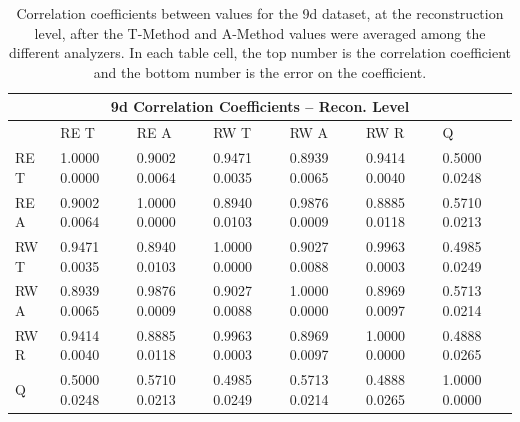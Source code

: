 \begin{table}[t]
\setlength\tabcolsep{15pt}
\footnotesize
\centering
\renewcommand{\arraystretch}{1.4}
\begin{tabularx}{0.8\linewidth}{@{\extracolsep{\fill}}lXXXXXX}
  \toprule
  	\multicolumn{7}{c}{{\normalsize 9d Correlation Coefficients -- Recon. Level}} \\
  \midrule
  	       & RE T & RE A & RW T & RW A & RW R & \quad Q \\
  \midrule
	RE T   & 1.0000 0.0000 & 0.9002 0.0064 & 0.9471 0.0035 & 0.8939 0.0065 & 0.9414 0.0040 & 0.5000 0.0248  \\
	RE A   & 0.9002 0.0064 & 1.0000 0.0000 & 0.8940 0.0103 & 0.9876 0.0009 & 0.8885 0.0118 & 0.5710 0.0213  \\
	RW T   & 0.9471 0.0035 & 0.8940 0.0103 & 1.0000 0.0000 & 0.9027 0.0088 & 0.9963 0.0003 & 0.4985 0.0249  \\
	RW A   & 0.8939 0.0065 & 0.9876 0.0009 & 0.9027 0.0088 & 1.0000 0.0000 & 0.8969 0.0097 & 0.5713 0.0214  \\
	RW R   & 0.9414 0.0040 & 0.8885 0.0118 & 0.9963 0.0003 & 0.8969 0.0097 & 1.0000 0.0000 & 0.4888 0.0265  \\
	Q      & 0.5000 0.0248 & 0.5710 0.0213 & 0.4985 0.0249 & 0.5713 0.0214 & 0.4888 0.0265 & 1.0000 0.0000  \\
  \bottomrule
\end{tabularx}
\caption[]{Correlation coefficients between \R values for the 9d dataset, at the reconstruction level, after the \RW T-Method and A-Method \R values were averaged among the different analyzers. In each table cell, the top number is the correlation coefficient and the bottom number is the error on the coefficient.}
\label{tab:Corrs_9d_recon}
\end{table}


